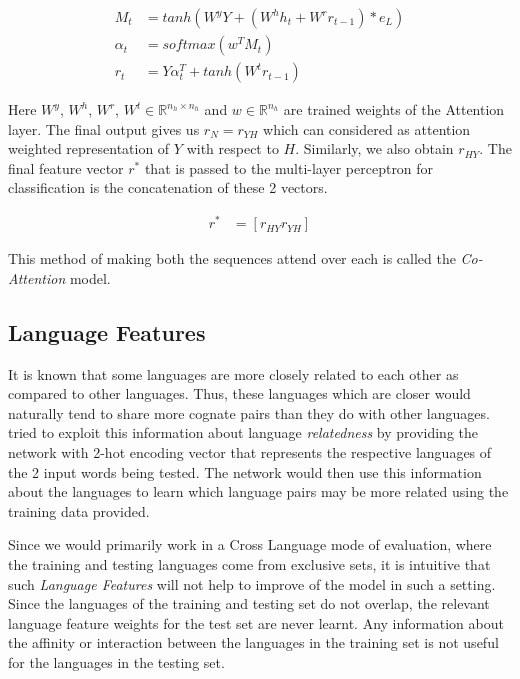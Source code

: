 \documentclass[11pt,letterpaper]{article}
\begin{document}
\begin{align}
M_t &= tanh(W^yY + (W^hh_t + W^rr_{t-1})*e_L) \\
\alpha_t &= softmax(w^TM_t) \\
r_t &= Y\alpha_t^T + tanh(W^tr_{t-1})
\end{align}

Here $W^y$, $W^h$, $W^r$, $W^t \in  \mathbb{R}^{n_h \times n_h}$ and $w \in \mathbb{R}^{n_h}$ are trained weights of the Attention layer. The final output gives us $r_N = r_{YH}$ which can considered as attention weighted representation of $Y$ with respect to $H$. Similarly, we also obtain $r_{HY}$. The final feature vector $r^*$ that is passed to the multi-layer perceptron for classification is the concatenation of these 2 vectors.

\begin{align}
r^* &= [r_{HY} r_{YH}]
\end{align}

 This method of making both the sequences attend over each is called the \textit{Co-Attention} model.
 
\subsection{Language Features}

It is known that some languages are more closely related to each other as compared to other languages. Thus, these languages which are closer would naturally tend to share more cognate pairs than they do with other languages. \cite{rama2016siamese} tried to exploit this information about language \textit{relatedness} by providing the network with 2-hot encoding vector that represents the respective languages of the 2 input words being tested. The network would then use this information about the languages to learn which language pairs may be more related using the training data provided.

Since we would primarily work in a Cross Language mode of evaluation, where the training and testing languages come from exclusive sets, it is intuitive that such \textit{Language Features} will not help to improve of the model in such a setting. Since the languages of the training and testing set do not overlap, the relevant language feature weights for the test set are never learnt. Any information about the affinity or interaction between the languages in the training set is not useful for the languages in the testing set. 
\end{document}
